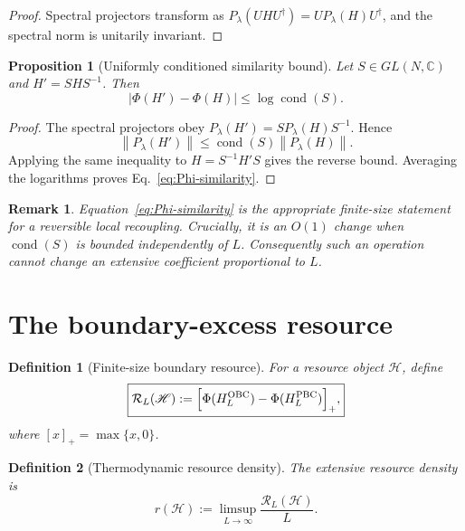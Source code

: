 \documentclass[reprint,amsmath,amssymb,aps,nofootinbib]{revtex4-2}
\newtheorem{definition}{Definition}
\newtheorem{proposition}{Proposition}
\newtheorem{remark}{Remark}
\newcommand{\norm}[1]{\left\lVert #1\right\rVert}
\newcommand{\cond}{\operatorname{cond}}
\newcommand{\PhiC}{\Phi}
\begin{document}
\begin{proof}
Spectral projectors transform as
\(P_\lambda(UHU^\dagger)=UP_\lambda(H)U^\dagger\), and the spectral norm is
unitarily invariant.
\end{proof}

\begin{proposition}[Uniformly conditioned similarity bound]
\label{prop:similarity}
Let \(S\in GL(N,\mathbb C)\) and \(H'=SHS^{-1}\). Then
\begin{equation}
\boxed{
|\PhiC(H')-\PhiC(H)|\le \log\cond(S).
}
\label{eq:Phi-similarity}
\end{equation}
\end{proposition}

\begin{proof}
The spectral projectors obey
\(P_\lambda(H')=SP_\lambda(H)S^{-1}\). Hence
\begin{equation}
\norm{P_\lambda(H')}
\le \cond(S)\norm{P_\lambda(H)}.
\end{equation}
Applying the same inequality to \(H=S^{-1}H'S\) gives the reverse bound.
Averaging the logarithms proves Eq.~\eqref{eq:Phi-similarity}.
\end{proof}

\begin{remark}
Equation~\eqref{eq:Phi-similarity} is the appropriate finite-size statement
for a reversible local recoupling. Crucially, it is an $O(1)$ change when
\(\cond(S)\) is bounded independently of $L$. Consequently such an operation
cannot change an extensive coefficient proportional to $L$.
\end{remark}

\section{The boundary-excess resource}
\label{sec:resource}

\begin{definition}[Finite-size boundary resource]
For a resource object \(\mathscr H\), define
\begin{equation}
\boxed{
\mathcal R_L(\mathscr H)
:=\Big[\PhiC(H_L^{\rm OBC})-\PhiC(H_L^{\rm PBC})\Big]_+,
}
\label{eq:Rfinite}
\end{equation}
where \([x]_+=\max\{x,0\}\).
\end{definition}

\begin{definition}[Thermodynamic resource density]
The extensive resource density is
\begin{equation}
\boxed{
 r(\mathscr H)
:=\limsup_{L\to\infty}\frac{\mathcal R_L(\mathscr H)}{L}.
}
\label{eq:r-density}
\end{equation}
\end{definition}
\end{document}
